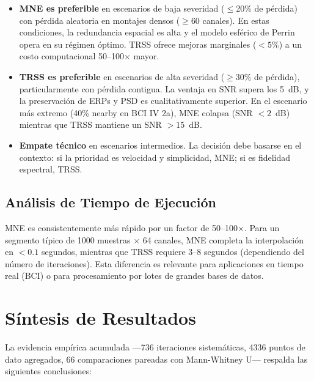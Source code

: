 \begin{itemize}
    \item \textbf{MNE es preferible} en escenarios de baja severidad ($\leq$20\% de pérdida) con pérdida aleatoria en montajes densos ($\geq$60 canales). En estas condiciones, la redundancia espacial es alta y el modelo esférico de Perrin opera en su régimen óptimo. TRSS ofrece mejoras marginales ($<5\%$) a un costo computacional 50--100$\times$ mayor.

    \item \textbf{TRSS es preferible} en escenarios de alta severidad ($\geq$30\% de pérdida), particularmente con pérdida contigua. La ventaja en SNR supera los 5~dB, y la preservación de ERPs y PSD es cualitativamente superior. En el escenario más extremo (40\% nearby en BCI IV 2a), MNE colapsa (SNR $< 2$~dB) mientras que TRSS mantiene un SNR $> 15$~dB.

    \item \textbf{Empate técnico} en escenarios intermedios. La decisión debe basarse en el contexto: si la prioridad es velocidad y simplicidad, MNE; si es fidelidad espectral, TRSS.
\end{itemize}

\subsection{Análisis de Tiempo de Ejecución}

MNE es consistentemente más rápido por un factor de 50--100$\times$. Para un segmento típico de 1000 muestras $\times$ 64 canales, MNE completa la interpolación en $< 0.1$ segundos, mientras que TRSS requiere 3--8 segundos (dependiendo del número de iteraciones). Esta diferencia es relevante para aplicaciones en tiempo real (BCI) o para procesamiento por lotes de grandes bases de datos.

\section{Síntesis de Resultados}

La evidencia empírica acumulada —736 iteraciones sistemáticas, 4336 puntos de dato agregados, 66 comparaciones pareadas con Mann-Whitney U— respalda las siguientes conclusiones:

